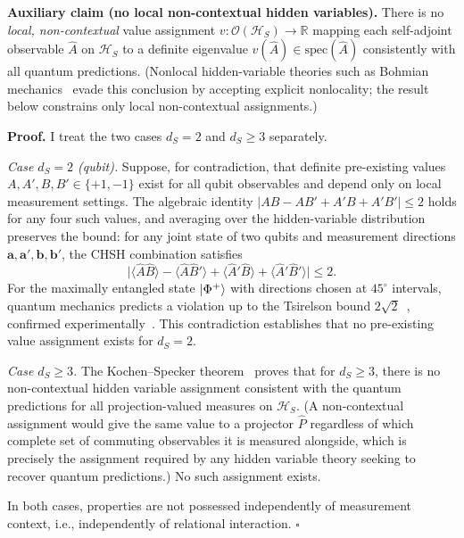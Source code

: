 \textbf{Auxiliary claim (no local non-contextual hidden variables).}
There is no \emph{local, non-contextual} value assignment
$v: \mathcal{O}(\mathcal{H}_S) \to \mathbb{R}$
mapping each self-adjoint observable $\hat{A}$ on $\mathcal{H}_S$ to a
definite eigenvalue $v(\hat{A}) \in \mathrm{spec}(\hat{A})$
consistently with all quantum predictions.
(Nonlocal hidden-variable theories such as Bohmian
mechanics~\cite{Bohm1980} evade this conclusion by accepting explicit
nonlocality; the result below constrains only local non-contextual
assignments.)

\textbf{Proof.}
I treat the two cases $d_S = 2$ and $d_S \geq 3$ separately.

\textit{Case $d_S = 2$ (qubit).}
Suppose, for contradiction, that definite pre-existing values
$A, A', B, B' \in \{+1,-1\}$ exist for all qubit observables and
depend only on local measurement settings.
The algebraic identity $|AB - AB' + A'B + A'B'| \leq 2$ holds for any
four such values, and averaging over the hidden-variable distribution
preserves the bound: for any joint state of two qubits and measurement
directions $\mathbf{a}, \mathbf{a}', \mathbf{b}, \mathbf{b}'$, the
CHSH combination satisfies
\begin{equation}
  \bigl|\langle\hat{A}\hat{B}\rangle - \langle\hat{A}\hat{B}'\rangle
    + \langle\hat{A}'\hat{B}\rangle + \langle\hat{A}'\hat{B}'\rangle\bigr|
  \leq 2.
\end{equation}
For the maximally entangled state $\ket{\Phi^+}$ with directions chosen at
$45^\circ$ intervals, quantum mechanics predicts a violation up to the
Tsirelson bound $2\sqrt{2}$~\cite{Tsirelson1980}, confirmed
experimentally~\cite{Aspect1982,Zeilinger2022Nobel}.
This contradiction establishes that no pre-existing value assignment exists
for $d_S = 2$.

\textit{Case $d_S \geq 3$.}
The Kochen--Specker theorem~\cite{KochenSpecker1967} proves that for
$d_S \geq 3$, there is no non-contextual hidden variable assignment
consistent with the quantum predictions for all projection-valued
measures on $\mathcal{H}_S$.
(A non-contextual assignment would give the same value to a projector
$\hat{P}$ regardless of which complete set of commuting observables it
is measured alongside, which is precisely the assignment required by any
hidden variable theory seeking to recover quantum predictions.)
No such assignment exists.

In both cases, properties are not possessed independently of measurement
context, i.e., independently of relational interaction. $\square$


